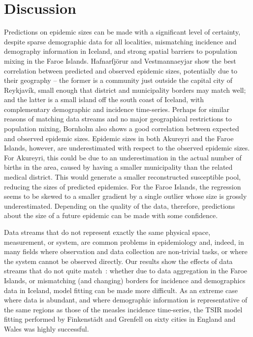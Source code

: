 \documentclass[10pt]{article}
\begin{document}
	 




























\section*{Discussion}

Predictions on epidemic sizes can be made with a significant level of certainty, despite sparse demographic data for all localities, mismatching incidence and demography information in Iceland, and strong spatial barriers to population mixing in the Faroe Islands. Hafnarfj\"{o}r\dh{}ur and Vestmannaeyjar show the best correlation between predicted and observed epidemic sizes, potentially due to their geography -- the former is a community just outside the capital city of Reykjav\'{i}k, small enough that district and municipality borders may match well; and the latter is a small island off the south coast of Iceland, with complementary demographic and incidence time-series. Perhaps for similar reasons of matching data streams and no major geographical restrictions to population mixing, Bornholm also shows a good correlation between expected and observed epidemic sizes. Epidemic sizes in both Akureyri and the Faroe Islands, however, are underestimated with respect to the observed epidemic sizes. For Akureyri, this could be due to an underestimation in the actual number of births in the area, caused by having a smaller municipality than the related medical district. This would generate a smaller reconstructed susceptible pool, reducing the sizes of predicted epidemics. For the Faroe Islands, the regression seems to be skewed to a smaller gradient by a single outlier whose size is grossly underestimated. Depending on the quality of the data, therefore, predictions about the size of a future epidemic can be made with some confidence. 

Data streams that do not represent exactly the same physical space, measurement, or system, are common problems in epidemiology and, indeed, in many fields where observation and data collection are non-trivial tasks, or where the system cannot be observed directly. Our results show the effects of data streams that do not quite match~: whether due to data aggregation in the Faroe Islands, or mismatching (and changing) borders for incidence and demographics data in Iceland, model fitting can be made more difficult. As an extreme case where data is abundant, and where demographic information is representative of the same regions as those of the measles incidence time-series, the TSIR model fitting performed by Finkenst\"{a}dt and Grenfell \cite{Finkenstadt2000} on sixty cities in England and Wales was highly successful.
\end{document}
